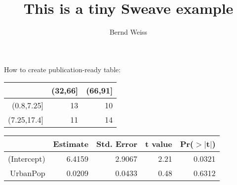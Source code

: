 \documentclass[noae]{article}
\title{This is a tiny Sweave example}
\author{Bernd Weiss}
\begin{document}
\maketitle

How to create publication-ready table:

\begin{table}[ht]
\begin{center}
\begin{tabular}{rrr}
  \hline
 & (32,66] & (66,91] \\ 
  \hline
(0.8,7.25] &  13 &  10 \\ 
  (7.25,17.4] &  11 &  14 \\ 
   \hline
\end{tabular}
\end{center}
\end{table}

\begin{table}[ht]
\begin{center}
\begin{tabular}{rrrrr}
  \hline
 & Estimate & Std. Error & t value & Pr($>$$|$t$|$) \\ 
  \hline
(Intercept) & 6.4159 & 2.9067 & 2.21 & 0.0321 \\ 
  UrbanPop & 0.0209 & 0.0433 & 0.48 & 0.6312 \\ 
   \hline
\end{tabular}
\end{center}
\end{table}
\end{document}
